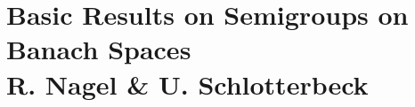 
\chapter{Basic Results on Semigroups on Banach Spaces \\
R. Nagel \& U. Schlotterbeck}\label{chap:A-I}
